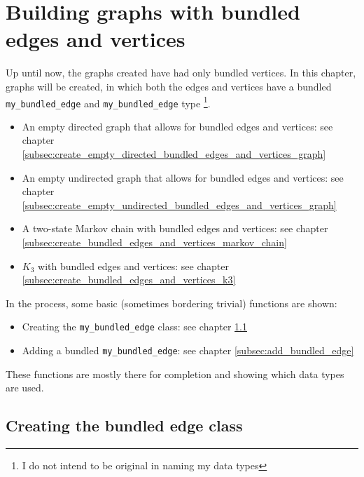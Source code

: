 \chapter{Building graphs with bundled edges and vertices}

Up until now, the graphs created have had only bundled vertices.
In this chapter, graphs will be created, in which both the edges and vertices
have a bundled \verb;my_bundled_edge; and \verb;my_bundled_edge; type
\footnote{I do not intend to be original in naming my data types}.

\begin{itemize}
  \item An empty directed graph that allows for bundled edges and vertices: 
    see chapter \ref{subsec:create_empty_directed_bundled_edges_and_vertices_graph}
  \item An empty undirected graph that allows for bundled edges and vertices: 
    see chapter \ref{subsec:create_empty_undirected_bundled_edges_and_vertices_graph}
  \item A two-state Markov chain with bundled edges and vertices: 
    see chapter \ref{subsec:create_bundled_edges_and_vertices_markov_chain}
  \item $K_{3}$ with bundled edges and vertices: 
    see chapter \ref{subsec:create_bundled_edges_and_vertices_k3}
\end{itemize}

In the process, some basic (sometimes bordering trivial) functions are shown:

\begin{itemize}
  \item Creating the \verb;my_bundled_edge; class: 
    see chapter \ref{subsec:my_bundled_edge}
  \item Adding a bundled \verb;my_bundled_edge;: 
    see chapter \ref{subsec:add_bundled_edge}
\end{itemize}

These functions are mostly there for completion and showing which data types
are used.

\section{Creating the bundled edge class}
\label{subsec:my_bundled_edge}

